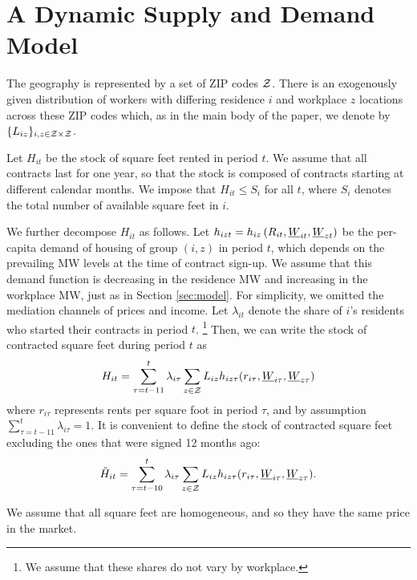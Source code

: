
\section{A Dynamic Supply and Demand Model}\label{sec:dyn_theory_model}

The geography is represented by a set of ZIP codes $\mathcal{Z}$.
There is an exogenously given distribution of workers with differing 
residence $i$ and workplace $z$ locations across these ZIP codes which,
as in the main body of the paper, we denote by $\{L_{iz}\}_{i,z\in\mathcal{Z}\times\mathcal{Z}}$.

Let $H_{it}$ be the stock of square feet rented in period $t$.
We assume that all contracts last for one year, so that
the stock is composed of contracts starting at different calendar months. 
We impose that $H_{it} \leq S_i$ for all $t$, 
where $S_i$ denotes the total number of available square feet in $i$.

We further decompose $H_{it}$ as follows.
Let $h_{izt} = h_{iz}\left(R_{it}, \underline{W}_{it}, \underline{W}_{zt}\right)$ be the 
per-capita demand of housing of group $(i,z)$ in period $t$,
which depends on the prevailing MW levels at the time of contract sign-up.
We assume that this demand function is decreasing in the residence MW and 
increasing in the workplace MW, just as in Section \ref{sec:model}.
For simplicity, we omitted the mediation channels of prices and income.
Let $\lambda_{it}$ denote the share of $i$'s residents who started their 
contracts in period $t$.%
\footnote{We assume that these shares do not vary by workplace.}
Then, we can write the stock of contracted square feet during period $t$ as
$$
H_{it} = \sum_{\tau = t - 11}^{t} \lambda_{i\tau} \sum_{z\in\mathcal{Z}} L_{iz} 
h_{iz\tau} (r_{i\tau}, \underline{W}_{i\tau}, \underline{W}_{z\tau})
$$
where 
$r_{i\tau}$ represents rents per square foot in period $\tau$, and
by assumption $\sum_{\tau = t - 11}^{t} \lambda_{i\tau} = 1$.
It is convenient to define the stock of contracted square feet excluding the ones 
that were signed 12 months ago:
$$
\tilde H_{it} = \sum_{\tau = t - 10}^{t} \lambda_{i\tau} \sum_{z\in\mathcal{Z}} L_{iz} 
h_{iz\tau} (r_{i\tau}, \underline{W}_{i\tau}, \underline{W}_{z\tau}) .
$$

We assume that all square feet are homogeneous, and so they have the same price 
in the market.

